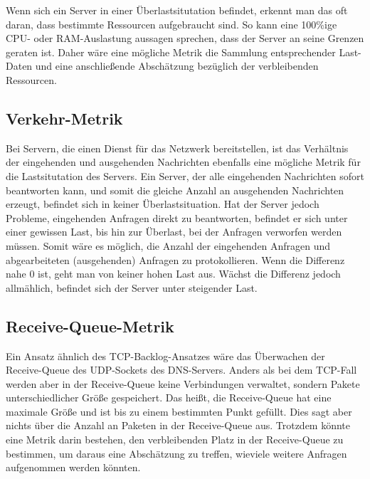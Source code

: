\documentclass[a4paper, 12pt, BCOR10mm, DIV12, toc=bibliography, toc=listof, german]{scrbook}
\begin{document}
		Wenn sich ein Server in einer Überlastsitutation befindet, erkennt man das oft daran, dass
		bestimmte Ressourcen aufgebraucht sind. So kann eine 100\%ige CPU- oder RAM-Auslastung aussagen
		sprechen, dass der Server an seine Grenzen geraten ist. Daher wäre eine mögliche Metrik die
		Sammlung entsprechender Last-Daten und eine anschließende Abschätzung bezüglich der verbleibenden
		Ressourcen.
		

		\subsection*{Verkehr-Metrik} %

		Bei Servern, die einen Dienst für das Netzwerk bereitstellen, ist das Verhältnis der eingehenden
		und ausgehenden Nachrichten ebenfalls eine mögliche Metrik für die Lastsitutation des Servers.
		Ein Server, der alle eingehenden Nachrichten sofort beantworten kann, und somit die gleiche
		Anzahl an ausgehenden Nachrichten erzeugt, befindet sich in keiner Überlastsituation.  Hat der
		Server jedoch Probleme, eingehenden Anfragen direkt zu beantworten, befindet er sich unter einer
		gewissen Last, bis hin zur Überlast, bei der Anfragen verworfen werden müssen.  Somit wäre es
		möglich, die Anzahl der eingehenden Anfragen und abgearbeiteten (ausgehenden) Anfragen zu
		protokollieren. Wenn die Differenz nahe 0 ist, geht man von keiner hohen Last aus.  Wächst die
		Differenz jedoch allmählich, befindet sich der Server unter steigender Last.


		\subsection*{Receive-Queue-Metrik} %

		Ein Ansatz ähnlich des TCP-Backlog-Ansatzes \cite{zinke2007,scsczile2008} wäre das Überwachen
		der Receive-Queue des UDP-Sockets des DNS-Servers. Anders als bei dem TCP-Fall werden aber in
		der Receive-Queue keine Verbindungen verwaltet, sondern Pakete unterschiedlicher Größe
		gespeichert. Das heißt, die Receive-Queue hat eine maximale Größe und ist bis zu einem
		bestimmten Punkt gefüllt. Dies sagt aber nichts über die Anzahl an Paketen in der Receive-Queue
		aus.  Trotzdem könnte eine Metrik darin bestehen, den verbleibenden Platz in der Receive-Queue
		zu bestimmen, um daraus eine Abschätzung zu treffen, wieviele weitere Anfragen aufgenommen
		werden könnten.
\end{document}
